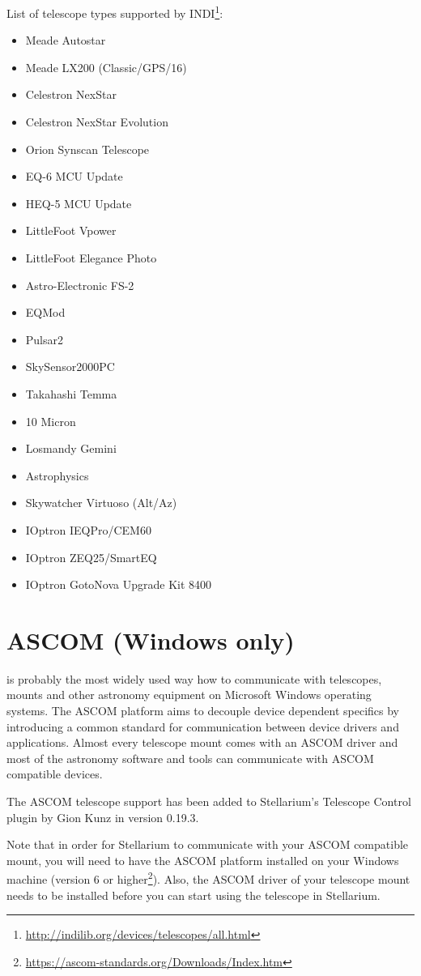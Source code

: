 List of telescope types supported by INDI\footnote{\url{http://indilib.org/devices/telescopes/all.html}}:
\begin{itemize}
\item Meade Autostar
\item Meade LX200 (Classic/GPS/16)
\item Celestron NexStar
\item Celestron NexStar Evolution
\item Orion Synscan Telescope
\item EQ-6 MCU Update
\item HEQ-5 MCU Update
\item LittleFoot Vpower
\item LittleFoot Elegance Photo
\item Astro-Electronic FS-2
\item EQMod
\item Pulsar2
\item SkySensor2000PC
\item Takahashi Temma
\item 10 Micron
\item Losmandy Gemini
\item Astrophysics
\item Skywatcher Virtuoso (Alt/Az)
\item IOptron IEQPro/CEM60
\item IOptron ZEQ25/SmartEQ
\item IOptron GotoNova Upgrade Kit 8400
\end{itemize}

\section{ASCOM (Windows only)}
\label{sec:plugins:TelescopeControl:ASCOM}

 is probably the most widely used
way how to communicate with telescopes, mounts and other astronomy
equipment on Microsoft Windows operating systems. The ASCOM platform
aims to decouple device dependent specifics by introducing a common
standard for communication between device drivers and
applications. Almost every telescope mount comes with an ASCOM driver
and most of the astronomy software and tools can communicate with
ASCOM compatible devices.

The ASCOM telescope support has been added to Stellarium's Telescope Control plugin by Gion Kunz in version 0.19.3.

Note that in order for Stellarium to communicate with your ASCOM
compatible mount, you will need to have the ASCOM platform installed
on your Windows machine (version 6 or
higher\footnote{\url{https://ascom-standards.org/Downloads/Index.htm}}). Also,
the ASCOM driver of your telescope mount needs to be installed before
you can start using the telescope in Stellarium.

